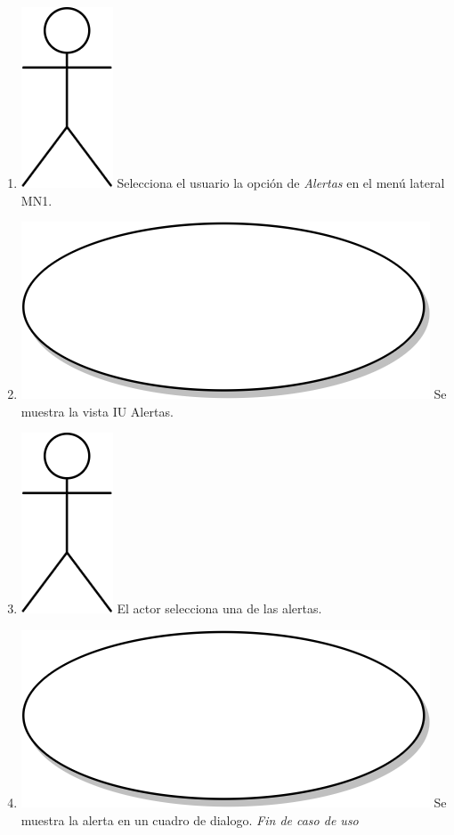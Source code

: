 \begin{enumerate}
\item {\includegraphics[scale=.1]{Capitulo3/img/actor.png} Selecciona el usuario la opción de \textit{Alertas} en el menú lateral MN1.}
\item {\includegraphics[scale=.05]{Capitulo3/img/proceso.png} Se muestra la vista IU Alertas.}
\item {\includegraphics[scale=.1]{Capitulo3/img/actor.png} El actor selecciona una de las alertas.}
\item {\includegraphics[scale=.05]{Capitulo3/img/proceso.png} Se muestra la alerta en un cuadro de dialogo.}
  \textit{Fin de caso de uso} \\  
\end{enumerate}

